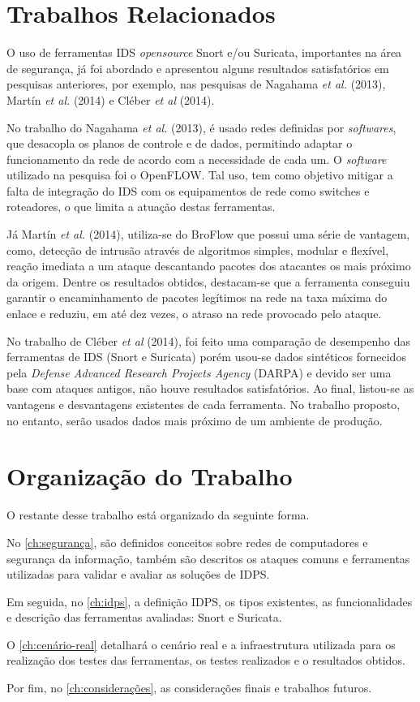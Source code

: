 \section{Trabalhos Relacionados} \label{sec:trabalhos-relacionados}

O uso de ferramentas IDS \textit{opensource} Snort e/ou Suricata, importantes na área de segurança, já foi abordado e apresentou alguns resultados satisfatórios em pesquisas anteriores, por exemplo, nas pesquisas de Nagahama \textit{et al.} (2013), Martín \textit{et al.} (2014) e Cléber \textit{et al} (2014).

No trabalho do Nagahama \textit{et al.} (2013), é usado redes definidas por \textit{softwares}, que desacopla os planos de controle e de dados, permitindo adaptar o funcionamento da rede de acordo com a necessidade de cada um. O \textit{software} utilizado na pesquisa foi o OpenFLOW. Tal uso, tem como objetivo mitigar a falta de integração do IDS com os equipamentos de rede como {switches} e roteadores, o que limita a atuação destas ferramentas. 

Já Martín \textit{et al.} (2014), utiliza-se do BroFlow que possui uma série de vantagem, como, detecção de intrusão através de algoritmos simples, modular e flexível, reação imediata a um ataque descantando pacotes dos atacantes os mais próximo da origem. Dentre os resultados obtidos, destacam-se que a ferramenta conseguiu garantir o encaminhamento de pacotes legítimos na rede na taxa máxima do enlace e reduziu, em até dez vezes, o atraso na rede provocado pelo ataque.

No trabalho de Cléber \textit{et al} (2014), foi feito uma comparação de desempenho das ferramentas de IDS (Snort e Suricata) porém usou-se dados sintéticos fornecidos pela \textit{Defense Advanced Research Projects Agency} (DARPA) e devido ser uma base com ataques antigos, não houve resultados satisfatórios. Ao final, listou-se as vantagens e desvantagens existentes de cada ferramenta. No trabalho proposto, no entanto, serão usados dados mais próximo de um ambiente de produção. 

\section{Organização do Trabalho} \label{sec:organização-do-trabalho}

O restante desse trabalho está organizado da seguinte forma.

No \autoref{ch:segurança}, são definidos conceitos sobre redes de computadores e segurança da informação, também são descritos os ataques comuns e ferramentas utilizadas para validar e avaliar as soluções de IDPS.

Em seguida, no \autoref{ch:idps}, a definição IDPS, os tipos existentes, as funcionalidades e descrição das ferramentas avaliadas: Snort e Suricata.

O \autoref{ch:cenário-real} detalhará o cenário real e a infraestrutura utilizada para os realização dos testes das ferramentas, os testes realizados e o resultados obtidos.

Por fim, no \autoref{ch:considerações}, as considerações finais e trabalhos futuros.
